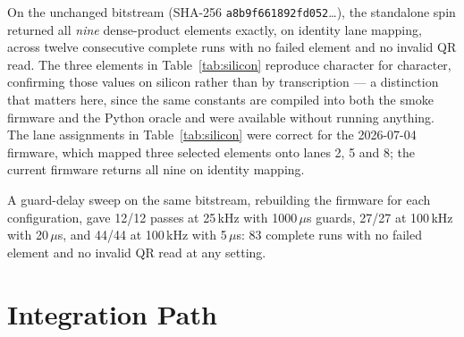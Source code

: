 \documentclass[conference]{IEEEtran}
\begin{document}
On the unchanged bitstream (SHA-256 \texttt{a8b9f661892fd052}\ldots), the
standalone spin returned all \emph{nine} dense-product elements exactly, on
identity lane mapping, across twelve consecutive complete runs with no failed
element and no invalid QR read. The three elements in
Table~\ref{tab:silicon} reproduce character for character, confirming those
values on silicon rather than by transcription --- a distinction that matters
here, since the same constants are compiled into both the smoke firmware and
the Python oracle and were available without running anything. The lane
assignments in Table~\ref{tab:silicon} were correct for the 2026-07-04
firmware, which mapped three selected elements onto lanes 2, 5 and 8; the
current firmware returns all nine on identity mapping.

A guard-delay sweep on the same bitstream, rebuilding the firmware for each
configuration, gave 12/12 passes at 25\,kHz with 1000\,$\mu$s guards, 27/27 at
100\,kHz with 20\,$\mu$s, and 44/44 at 100\,kHz with 5\,$\mu$s: 83 complete
runs with no failed element and no invalid QR read at any setting.

\begin{table}[ht]
\centering
\caption{Silicon QR readback, standalone SU3 spin (2026-07-04).}
\label{tab:silicon}
\end{table}

\section{Integration Path}
\end{document}
